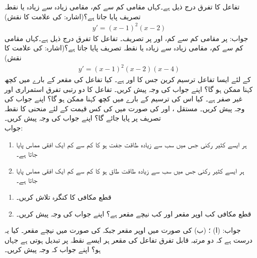 تفاعل  کا تفرق درج ذیل ہے۔کہاں مقامی کم سے کم، مقامی زیادہ سے زیادہ یا  نقطہ تصریف پایا جاتا ہے؟(اشارہ:  کی علامت کا نقش) 
\begin{align*}
y'=(x-1)^2(x-2)
\end{align*}
جواب:\quad
{} پر مقامی کم سے کم،  اور  پر تصریف۔
تفاعل  کا تفرق درج ذیل ہے۔کہاں مقامی کم سے کم، مقامی زیادہ سے زیادہ یا  نقطہ تصریف پایا جاتا ہے؟(اشارہ:  کی علامت کا نقش) 
\begin{align*}
y'=(x-1)^2(x-2)(x-4)
\end{align*}
 کے لئے ایسا تفاعل  ترسیم کرین جس کا  اور  ہے۔ کیا تفاعل کی مقعر کے بارے میں کچھ کہنا ممکن ہو گا؟ اپنے جواب کی وجہ پیش کریں۔
تفاعل  کا دو رتبی تفرق استمراری اور غیر صفر ہے۔ کیا اس کی ترسیم کے بارے میں کچھ کہنا ممکن ہو گا؟ اپنے جواب کی وجہ پیش کریں۔
مستقل ،  اور  کی صورت میں  کی کس قیمت کے لئے منحنی  کا نقطہ تصریف  پر پایا جائے گا؟ اپنے جواب کی وجہ پیش کریں۔\\
جواب:\quad
{}
\begin{enumerate}
\item
ہر ایسے کثیر رکنی جس میں سب سے زیادہ طاقت جفت ہو  کا کم سے کم ایک افقی مماس پایا جاتا ہے۔
\item
ہر ایسے کثیر رکنی جس میں سب سے زیادہ طاقت طاق ہو  کا کم سے کم ایک افقی مماس پایا جاتا ہے۔
\end{enumerate}
\begin{enumerate}
\item
قطع مکافی  کا کنگرہ تلاش کریں۔
\item
قطع مکافی کب اوپر مقعر اور کب  نیچے مقعر ہے؟ اپنے جواب کی وجہ پیش کریں۔
\end{enumerate}
جواب:\quad
(ا) ؛ (ب)  کی صورت میں اوپر مقعر جبکہ  کی صورت میں نیچے مقعر۔
کیا یہ درست ہے کہ دو مرتبہ قابل تفرق تفاعل  کی مقعر ہر ایسے نقطہ پر تبدیل ہوتی ہے جہاں  ہو؟ اپنے جواب کہ وجہ پیش کریں۔
